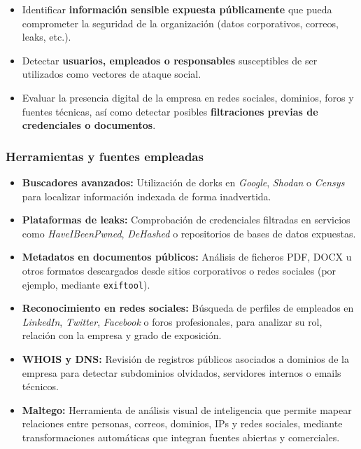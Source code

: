 \documentclass[a4paper, 11pt]{article}
\begin{document}
\begin{itemize}
    \item Identificar \textbf{información sensible expuesta públicamente} que pueda comprometer la seguridad de la organización (datos corporativos, correos, leaks, etc.).
    \item Detectar \textbf{usuarios, empleados o responsables} susceptibles de ser utilizados como vectores de ataque social.
    \item Evaluar la presencia digital de la empresa en redes sociales, dominios, foros y fuentes técnicas, así como detectar posibles \textbf{filtraciones previas de credenciales o documentos}.
\end{itemize}


\subsubsection*{Herramientas y fuentes empleadas}

\begin{itemize}
    \item \textbf{Buscadores avanzados:} Utilización de dorks en \textit{Google}, \textit{Shodan} o \textit{Censys} para localizar información indexada de forma inadvertida.
    \item \textbf{Plataformas de leaks:} Comprobación de credenciales filtradas en servicios como \textit{HaveIBeenPwned}, \textit{DeHashed} o repositorios de bases de datos expuestas.
    \item \textbf{Metadatos en documentos públicos:} Análisis de ficheros PDF, DOCX u otros formatos descargados desde sitios corporativos o redes sociales (por ejemplo, mediante \texttt{exiftool}).
    \item \textbf{Reconocimiento en redes sociales:} Búsqueda de perfiles de empleados en \textit{LinkedIn}, \textit{Twitter}, \textit{Facebook} o foros profesionales, para analizar su rol, relación con la empresa y grado de exposición.
    \item \textbf{WHOIS y DNS:} Revisión de registros públicos asociados a dominios de la empresa para detectar subdominios olvidados, servidores internos o emails técnicos.
    \item \textbf{Maltego:} Herramienta de análisis visual de inteligencia que permite mapear relaciones entre personas, correos, dominios, IPs y redes sociales, mediante transformaciones automáticas que integran fuentes abiertas y comerciales.
\end{itemize}
\end{document}
